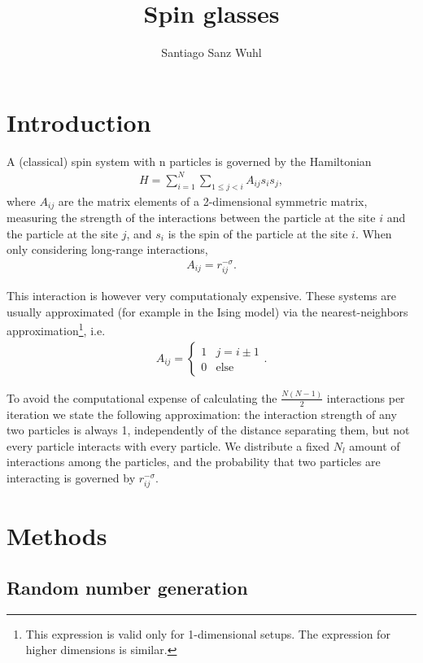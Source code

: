 \documentclass[a4paper]{article}
\title{Spin glasses}
\author{Santiago Sanz Wuhl}
\begin{document}
\maketitle

\section{Introduction}
A (classical) spin system with n particles is governed by the Hamiltonian 
\begin{align}
	H = \sum_{i=1}^{N} \sum_{1\le j < i} A_{ij} s_i s_j,
\end{align}
where $A_{ij}$ are the matrix elements of a 2-dimensional symmetric matrix, measuring the strength of the interactions between the particle at the site $i$ and the particle at the site $j$, and $s_i$ is the spin of the particle at the site $i$.
When only considering long-range interactions, 
\begin{align}
	A_{ij} = r_{ij}^{-\sigma}.
\end{align}

This interaction is however very computationaly expensive. These systems are usually approximated  (for example in the Ising model) via the nearest-neighbors approximation\footnote{This expression is valid only for 1-dimensional setups. The expression for higher dimensions is similar.}, i.e. 
\begin{align}
	A_{ij}=
	\begin{cases}
		1 & j = i \pm 1\\
		0 & \text{else}
	\end{cases}.
\end{align}

To avoid the computational expense of calculating the $\frac{N(N-1)}{2}$ interactions per iteration we state the following approximation: the interaction strength of any two particles is always 1, independently of the  distance separating them, but not every particle interacts with every particle. We distribute a fixed $N_l$ amount of interactions  among the particles, and the probability that two particles are interacting is governed by $r_{ij}^{-\sigma}$.

\section{Methods}
\subsection{Random number generation}
\end{document}
